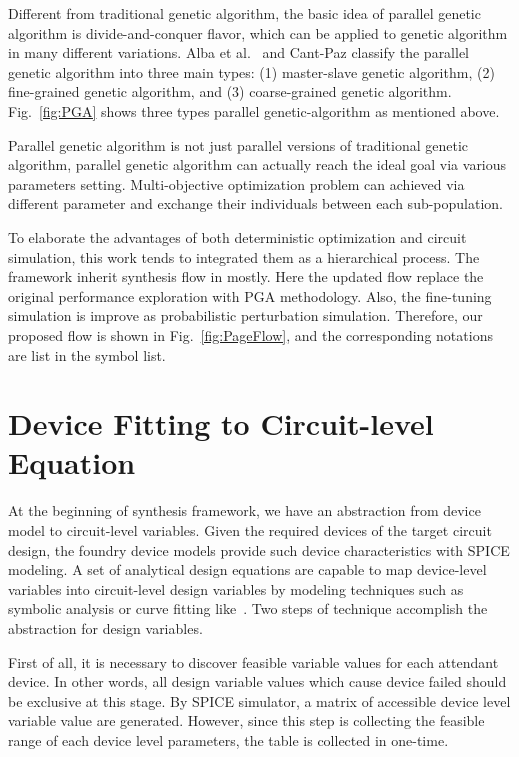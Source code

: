      Different from traditional genetic algorithm, the basic idea of parallel genetic algorithm is divide-and-conquer flavor, which can be applied to genetic algorithm in many different variations. Alba et al.~\cite{SurveyDistPGA1997} and Cant-Paz \cite{SurveyPGA1997} classify the parallel genetic algorithm into three main types: (1) master-slave genetic algorithm, (2) fine-grained genetic algorithm, and (3) coarse-grained genetic algorithm. Fig.~\ref{fig:PGA} shows three types parallel genetic-algorithm as mentioned above.
          
      Parallel genetic algorithm is not just parallel versions of traditional genetic algorithm, parallel genetic algorithm can actually reach the ideal goal via various parameters setting. Multi-objective optimization problem can achieved via different parameter and exchange their individuals between each sub-population.

    To elaborate the advantages of both deterministic optimization and circuit simulation, this work tends to integrated them as a hierarchical process. The framework inherit synthesis flow in \cite{PerfMap_ISQED2011} mostly. Here the updated flow replace the original performance exploration with PGA methodology. Also, the fine-tuning simulation is improve as probabilistic perturbation simulation. Therefore, our proposed flow is shown in Fig.~\ref{fig:PageFlow}, and the corresponding notations are list in the symbol list.

  \section{Device Fitting to Circuit-level Equation}
    At the beginning of synthesis framework, we have an abstraction from device model to circuit-level variables. Given the required devices of the target circuit design, the foundry device models provide such device characteristics with SPICE modeling. A set of analytical design equations are capable to map device-level variables into circuit-level design variables by modeling techniques such as symbolic analysis or curve fitting like~\cite{PWL_Convex_GP,Eeckelaert_DATE2003,Daems_DAC2002}. Two steps of technique accomplish the abstraction for design variables. 

    First of all, it is necessary to discover feasible variable values for each attendant device. In other words, all design variable values which cause device failed should be exclusive at this stage. By SPICE simulator, a matrix of accessible device level variable value are generated. However, since this step is collecting the feasible range of each device level parameters, the table is collected in one-time. 

